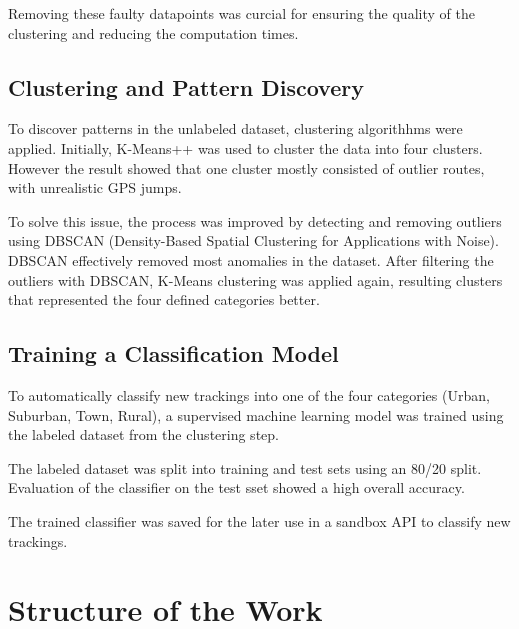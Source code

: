 \documentclass[a4paper,12pt,twoside]{scrreprt}
\begin{document}
Removing these faulty datapoints was curcial for ensuring the quality of the
clustering and reducing the computation times.

\subsection{Clustering and Pattern Discovery}
To discover patterns in the unlabeled dataset, clustering algorithhms were
applied.
Initially, K-Means++ was used to cluster the data into four clusters. However
the result showed that one cluster mostly consisted of outlier routes, with
unrealistic GPS jumps.

To solve this issue, the process was improved by detecting and removing
outliers using DBSCAN (Density-Based Spatial Clustering for Applications with
Noise). DBSCAN effectively removed most anomalies in the dataset. After
filtering the outliers with DBSCAN, K-Means clustering was applied again,
resulting clusters that represented the four defined categories better.

\subsection{Training a Classification Model}
To automatically classify new trackings into one of the four categories (Urban,
Suburban, Town, Rural), a supervised machine learning model was trained using
the labeled dataset from the clustering step.

The labeled dataset was split into training and test sets using an 80/20 split.
Evaluation of the classifier on the test sset showed a high overall accuracy.

The trained classifier was saved for the later use in a sandbox API to classify
new trackings.



\section{Structure of the Work}
\end{document}
